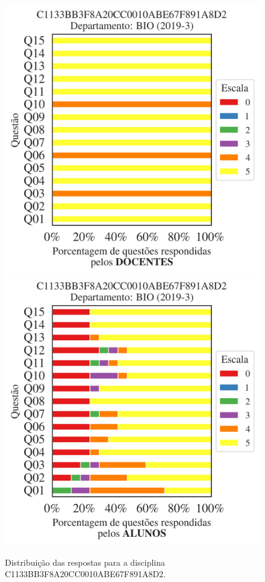 \documentclass[a4paper,10pt]{article}
\begin{document}
\begin{figure}[h]
\centering
\includegraphics[width=0.485\linewidth]{analise_disciplina_departamento_BIO_C1133BB3F8A20CC0010ABE67F891A8D2_docentes.png}
\includegraphics[width=0.485\linewidth]{analise_disciplina_departamento_BIO_C1133BB3F8A20CC0010ABE67F891A8D2_alunos.png}
\caption{\label{fig:analise_geral_departamento}                Distribuição das respostas para a disciplina C1133BB3F8A20CC0010ABE67F891A8D2. }
\end{figure}
\end{document}
